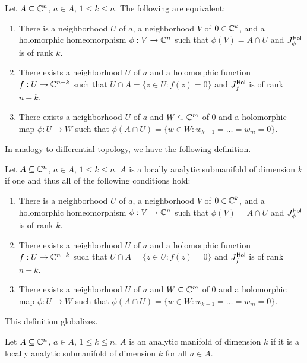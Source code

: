 \begin{theorem}[Submanifold]\label{thm: submanifold}
    Let $A\subseteq\mathbb{C}^{n}$, $a\in A$, $1\leq k\leq n$. The following are equivalent:
    \begin{enumerate}[label=(\alph*)]
        \item There is a neighborhood $U$ of $a$, a neighborhood $V$ of $0\in\mathbb{C}^{k}$, and a holomorphic homeomorphism $\phi:V\to\mathbb{C}^{n}$ such that $\phi(V)=A\cap U$ and $J_{\phi}^{\mathsf{Hol}}$ is of rank $k$. 
        \item There exists a neighborhood $U$ of $a$ and a holomorphic function $f:U\to\mathbb{C}^{n-k}$ such that $U\cap A=\{z\in U:f(z)=0\}$ and $J^{\mathsf{Hol}}_{f}$ is of rank $n-k$. 
        \item There exists a neighborhood $U$ of $a$ and $W\subseteq\mathbb{C}^{m}$ of 0 and a holomorphic map $\phi:U\to W$ such that $\phi(A\cap U)=\{w\in W:w_{k+1}=\dots=w_{m}=0\}$. 
    \end{enumerate}
\end{theorem}
In analogy to differential topology, we have the following definition. 
\begin{definition}\label{def: locally analytic submanifold}
    Let $A\subseteq\mathbb{C}^{n}$, $a\in A$, $1\leq k\leq n$. $A$ is a locally analytic submanifold of dimension $k$ if one and thus all of the following conditions hold:
    \begin{enumerate}[label=(\alph*)]
        \item There is a neighborhood $U$ of $a$, a neighborhood $V$ of $0\in\mathbb{C}^{k}$, and a holomorphic homeomorphism $\phi:V\to\mathbb{C}^{n}$ such that $\phi(V)=A\cap U$ and $J_{\phi}^{\mathsf{Hol}}$ is of rank $k$. 
        \item There exists a neighborhood $U$ of $a$ and a holomorphic function $f:U\to\mathbb{C}^{n-k}$ such that $U\cap A=\{z\in U:f(z)=0\}$ and $J^{\mathsf{Hol}}_{f}$ is of rank $n-k$. 
        \item There exists a neighborhood $U$ of $a$ and $W\subseteq\mathbb{C}^{m}$ of 0 and a holomorphic map $\phi:U\to W$ such that $\phi(A\cap U)=\{w\in W:w_{k+1}=\dots=w_{m}=0\}$. 
    \end{enumerate}
\end{definition}
This definition globalizes. 
\begin{definition}\label{def: analytic submanifold}
    Let $A\subseteq\mathbb{C}^{n}$, $a\in A$, $1\leq k\leq n$. $A$ is an analytic manifold of dimension $k$ if it is a locally analytic submanifold of dimension $k$ for all $a\in A$. 
\end{definition}
